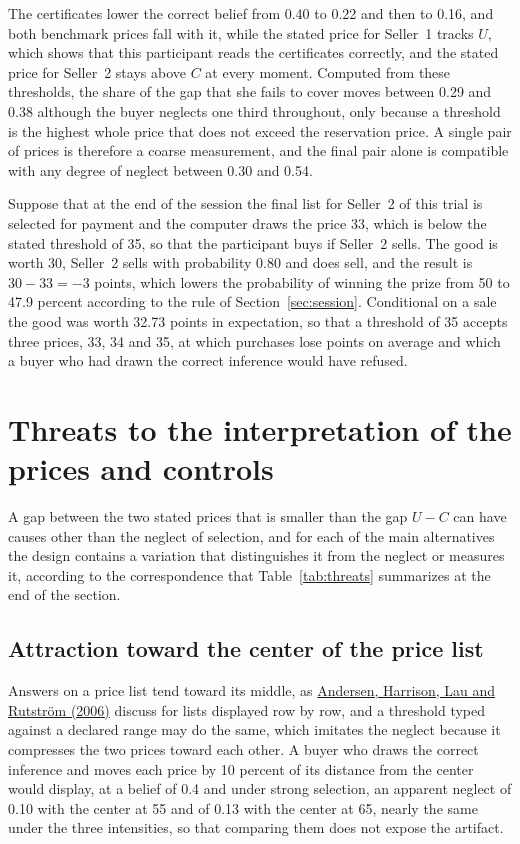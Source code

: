 \documentclass[11pt,a4paper]{article}
\newcommand{\cy}[2]{\hyperlink{cite.#1}{\textcolor{citecolor}{#2}}}
\begin{document}
The certificates lower the correct belief from 0.40 to 0.22 and then to 0.16, and both benchmark prices fall with it, while the stated price for Seller~1 tracks $U$, which shows that this participant reads the certificates correctly, and the stated price for Seller~2 stays above $C$ at every moment. Computed from these thresholds, the share of the gap that she fails to cover moves between 0.29 and 0.38 although the buyer neglects one third throughout, only because a threshold is the highest whole price that does not exceed the reservation price. A single pair of prices is therefore a coarse measurement, and the final pair alone is compatible with any degree of neglect between 0.30 and 0.54.

Suppose that at the end of the session the final list for Seller~2 of this trial is selected for payment and the computer draws the price 33, which is below the stated threshold of 35, so that the participant buys if Seller~2 sells. The good is worth 30, Seller~2 sells with probability 0.80 and does sell, and the result is $30-33=-3$ points, which lowers the probability of winning the prize from 50 to 47.9 percent according to the rule of Section~\ref{sec:session}. Conditional on a sale the good was worth 32.73 points in expectation, so that a threshold of 35 accepts three prices, 33, 34 and 35, at which purchases lose points on average and which a buyer who had drawn the correct inference would have refused.

\section{Threats to the interpretation of the prices and controls}\label{sec:threats}

A gap between the two stated prices that is smaller than the gap $U-C$ can have causes other than the neglect of selection, and for each of the main alternatives the design contains a variation that distinguishes it from the neglect or measures it, according to the correspondence that Table~\ref{tab:threats} summarizes at the end of the section.

\subsection{Attraction toward the center of the price list}

Answers on a price list tend toward its middle, as \cy{andersen}{Andersen, Harrison, Lau and Rutstr\"om (2006)} discuss for lists displayed row by row, and a threshold typed against a declared range may do the same, which imitates the neglect because it compresses the two prices toward each other. A buyer who draws the correct inference and moves each price by 10 percent of its distance from the center would display, at a belief of 0.4 and under strong selection, an apparent neglect of 0.10 with the center at 55 and of 0.13 with the center at 65, nearly the same under the three intensities, so that comparing them does not expose the artifact.
\end{document}

